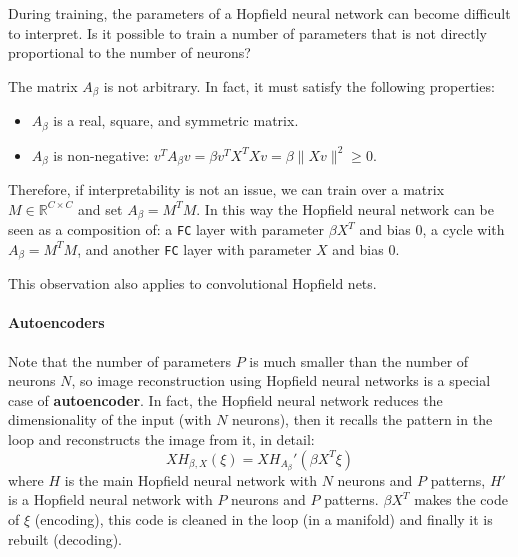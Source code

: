 \begin{remark}
	During training, the parameters of a Hopfield neural network can become difficult to interpret. Is it possible to train a number of parameters that is not directly proportional to the number of neurons?

	\noindent The matrix $A_\beta$ is not arbitrary. In fact, it must satisfy the following properties:
	\begin{itemize}[itemsep=2pt, topsep=10pt]
		\item $A_\beta$ is a real, square, and symmetric matrix.
		\item $A_\beta$ is non-negative: $v^T A_\beta v = \beta v^T X^T X v = \beta \|Xv\|^2 \geq 0$.
	\end{itemize}
	Therefore, if interpretability is not an issue, we can train over a matrix $M \in \mathbb{R}^{C \times C}$ and set $A_\beta = M^T M$. In this way the Hopfield neural network can be seen as a composition of: a \texttt{FC} layer with parameter $\beta X^T$ and bias $0$, a cycle with $A_\beta = M^T M$, and another \texttt{FC} layer with parameter $X$ and bias $0$.

	\noindent This observation also applies to convolutional Hopfield nets.
\end{remark}

\paragraph{Autoencoders}
Note that the number of parameters $P$ is much smaller than the number of neurons $N$, so image reconstruction using Hopfield neural networks is a special case of \textbf{autoencoder}. In fact, the Hopfield neural network reduces the dimensionality of the input (with $N$ neurons), then it recalls the pattern in the loop and reconstructs the image from it, in detail:
\[
XH_{\beta,X}\left(\xi\right) = XH_{A_\beta}'\left(\beta X^T\xi\right)
\]
where $H$ is the main Hopfield neural network with $N$ neurons and $P$ patterns, $H'$ is a Hopfield neural network with $P$ neurons and $P$ patterns. $\beta X^T$ makes the code of $\xi$ (encoding), this code is cleaned in the loop (in a manifold) and finally it is rebuilt (decoding).

